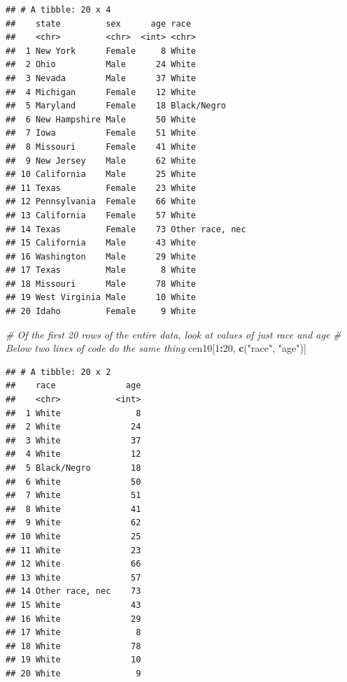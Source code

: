 \documentclass[]{book}
\newenvironment{Shaded}{\begin{snugshade}}{\end{snugshade}}
\newcommand{\CommentTok}[1]{\textcolor[rgb]{0.56,0.35,0.01}{\textit{#1}}}
\newcommand{\DecValTok}[1]{\textcolor[rgb]{0.00,0.00,0.81}{#1}}
\newcommand{\KeywordTok}[1]{\textcolor[rgb]{0.13,0.29,0.53}{\textbf{#1}}}
\newcommand{\NormalTok}[1]{#1}
\newcommand{\OperatorTok}[1]{\textcolor[rgb]{0.81,0.36,0.00}{\textbf{#1}}}
\newcommand{\StringTok}[1]{\textcolor[rgb]{0.31,0.60,0.02}{#1}}
\theoremstyle{definition}
\theoremstyle{definition}
\theoremstyle{definition}
\theoremstyle{remark}
\begin{document}
\begin{Shaded}
\begin{Highlighting}[]
\begin{verbatim}
## # A tibble: 20 x 4
##    state         sex      age race           
##    <chr>         <chr>  <int> <chr>          
##  1 New York      Female     8 White          
##  2 Ohio          Male      24 White          
##  3 Nevada        Male      37 White          
##  4 Michigan      Female    12 White          
##  5 Maryland      Female    18 Black/Negro    
##  6 New Hampshire Male      50 White          
##  7 Iowa          Female    51 White          
##  8 Missouri      Female    41 White          
##  9 New Jersey    Male      62 White          
## 10 California    Male      25 White          
## 11 Texas         Female    23 White          
## 12 Pennsylvania  Female    66 White          
## 13 California    Female    57 White          
## 14 Texas         Female    73 Other race, nec
## 15 California    Male      43 White          
## 16 Washington    Male      29 White          
## 17 Texas         Male       8 White          
## 18 Missouri      Male      78 White          
## 19 West Virginia Male      10 White          
## 20 Idaho         Female     9 White
\end{verbatim}

\begin{Shaded}
\begin{Highlighting}[]
\CommentTok{# Of the first 20 rows of the entire data, look at values of just race and age}
\CommentTok{# Below two lines of code do the same thing}
\NormalTok{cen10[}\DecValTok{1}\OperatorTok{:}\DecValTok{20}\NormalTok{, }\KeywordTok{c}\NormalTok{(}\StringTok{"race"}\NormalTok{, }\StringTok{"age"}\NormalTok{)]}
\end{Highlighting}
\end{Shaded}

\begin{verbatim}
## # A tibble: 20 x 2
##    race              age
##    <chr>           <int>
##  1 White               8
##  2 White              24
##  3 White              37
##  4 White              12
##  5 Black/Negro        18
##  6 White              50
##  7 White              51
##  8 White              41
##  9 White              62
## 10 White              25
## 11 White              23
## 12 White              66
## 13 White              57
## 14 Other race, nec    73
## 15 White              43
## 16 White              29
## 17 White               8
## 18 White              78
## 19 White              10
## 20 White               9
\end{verbatim}


\end{Highlighting}
\end{Shaded}
\end{document}
